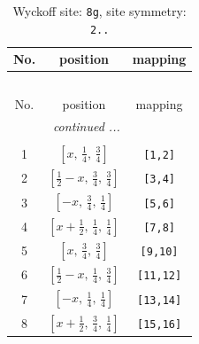 \documentclass[fleqn,8pt]{jsarticle}
\begin{document}
\begin{longtable}{ccc}
\caption{Wyckoff site: {\tt 8g}, site symmetry: {\tt 2..}}
 \\
 \hline \hline
No. & position & mapping \\ \hline \endfirsthead

\multicolumn{2}{l}{\tablename\ \thetable{}} \\
 \hline \hline
No. & position & mapping \\ \hline \endhead

 \hline \hline
\multicolumn{2}{r}{\footnotesize\it continued ...} \\ \endfoot

 \hline \hline
\multicolumn{2}{r}{} \\ \endlastfoot

1 & $\left[ x,\, \frac{1}{4},\, \frac{3}{4} \right]$ & {\tt [1,2]} \\ \hline
2 & $\left[ \frac{1}{2} - x,\, \frac{3}{4},\, \frac{3}{4} \right]$ & {\tt [3,4]} \\ \hline
3 & $\left[ - x,\, \frac{3}{4},\, \frac{1}{4} \right]$ & {\tt [5,6]} \\ \hline
4 & $\left[ x + \frac{1}{2},\, \frac{1}{4},\, \frac{1}{4} \right]$ & {\tt [7,8]} \\ \hline
5 & $\left[ x,\, \frac{3}{4},\, \frac{3}{4} \right]$ & {\tt [9,10]} \\ \hline
6 & $\left[ \frac{1}{2} - x,\, \frac{1}{4},\, \frac{3}{4} \right]$ & {\tt [11,12]} \\ \hline
7 & $\left[ - x,\, \frac{1}{4},\, \frac{1}{4} \right]$ & {\tt [13,14]} \\ \hline
8 & $\left[ x + \frac{1}{2},\, \frac{3}{4},\, \frac{1}{4} \right]$ & {\tt [15,16]} \\
\end{longtable}
\renewcommand{\arraystretch}{1.2}
\end{document}
